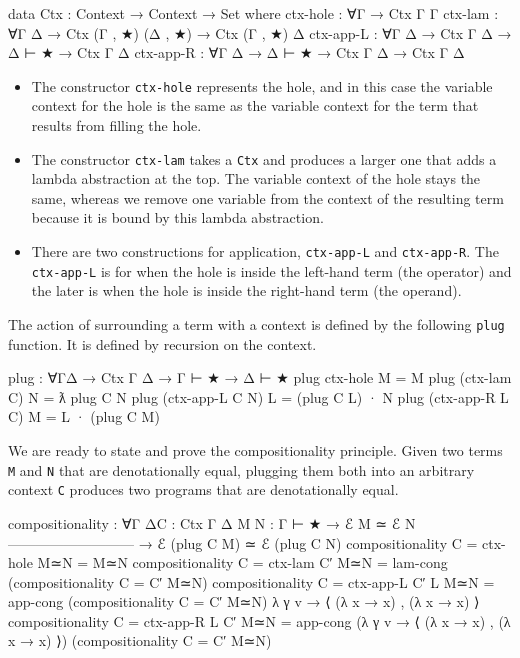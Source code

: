 \begin{fence}
\begin{code}
data Ctx : Context → Context → Set where
  ctx-hole : ∀{Γ} → Ctx Γ Γ
  ctx-lam :  ∀{Γ Δ} → Ctx (Γ , ★) (Δ , ★) → Ctx (Γ , ★) Δ
  ctx-app-L : ∀{Γ Δ} → Ctx Γ Δ → Δ ⊢ ★ → Ctx Γ Δ
  ctx-app-R : ∀{Γ Δ} → Δ ⊢ ★ → Ctx Γ Δ → Ctx Γ Δ
\end{code}
\end{fence}

\begin{itemize}
\item
  The constructor \texttt{ctx-hole} represents the hole, and in this
  case the variable context for the hole is the same as the variable
  context for the term that results from filling the hole.
\item
  The constructor \texttt{ctx-lam} takes a \texttt{Ctx} and produces a
  larger one that adds a lambda abstraction at the top. The variable
  context of the hole stays the same, whereas we remove one variable
  from the context of the resulting term because it is bound by this
  lambda abstraction.
\item
  There are two constructions for application, \texttt{ctx-app-L} and
  \texttt{ctx-app-R}. The \texttt{ctx-app-L} is for when the hole is
  inside the left-hand term (the operator) and the later is when the
  hole is inside the right-hand term (the operand).
\end{itemize}

The action of surrounding a term with a context is defined by the
following \texttt{plug} function. It is defined by recursion on the
context.

\begin{fence}
\begin{code}
plug : ∀{Γ}{Δ} → Ctx Γ Δ → Γ ⊢ ★ → Δ ⊢ ★
plug ctx-hole M = M
plug (ctx-lam C) N = ƛ plug C N
plug (ctx-app-L C N) L = (plug C L) · N
plug (ctx-app-R L C) M = L · (plug C M)
\end{code}
\end{fence}

We are ready to state and prove the compositionality principle. Given
two terms \texttt{M} and \texttt{N} that are denotationally equal,
plugging them both into an arbitrary context \texttt{C} produces two
programs that are denotationally equal.

\begin{fence}
\begin{code}
compositionality : ∀{Γ Δ}{C : Ctx Γ Δ} {M N : Γ ⊢ ★}
  → ℰ M ≃ ℰ N
    ---------------------------
  → ℰ (plug C M) ≃ ℰ (plug C N)
compositionality {C = ctx-hole} M≃N =
  M≃N
compositionality {C = ctx-lam C′} M≃N =
  lam-cong (compositionality {C = C′} M≃N)
compositionality {C = ctx-app-L C′ L} M≃N =
  app-cong (compositionality {C = C′} M≃N) λ γ v → ⟨ (λ x → x) , (λ x → x) ⟩
compositionality {C = ctx-app-R L C′} M≃N =
  app-cong (λ γ v → ⟨ (λ x → x) , (λ x → x) ⟩) (compositionality {C = C′} M≃N)
\end{code}
\end{fence}

